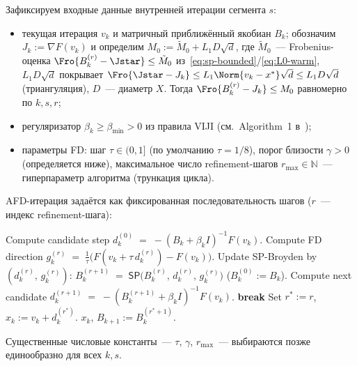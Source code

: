 Зафиксируем входные данные внутренней итерации сегмента $s$:
\begin{itemize}
\item текущая итерация $v_k$ и матричный приближённый якобиан $B_k$;
      обозначим $J_k := \nabla F(v_k)$ и определим
      $M_0 := \tilde M_{0} + L_1 D \sqrt{d}$, где $\tilde M_{0}$~---
      Frobenius-оценка $\Fro{B_k^{(r)} - \Jstar} \le \tilde M_{0}$
      из~\eqref{eq:sp-bounded}/\eqref{eq:L0-warm}, $L_1 D \sqrt{d}$
      покрывает $\Fro{\Jstar - J_k}\le L_1\Norm{v_k - x^*}\sqrt{d}\le L_1 D\sqrt{d}$
      (триангуляция), $D$~--- диаметр $X$. Тогда $\Fro{B_k^{(r)} - J_k}\le M_0$
      равномерно по $k, s, r$;
\item регуляризатор $\beta_k \ge \beta_{\min} > 0$ из правила VIJI
      (см.~Algorithm~1 в~\cite{Agafonov2024VIJI});
\item параметры FD: шаг $\tau \in (0, 1]$ (по умолчанию $\tau = 1/8$),
      порог близости $\gamma > 0$ (определяется ниже), максимальное
      число refinement-шагов $r_{\max} \in \mathbb{N}$~--- гиперпараметр
      алгоритма (трункация цикла).
\end{itemize}
AFD-итерация задаётся как фиксированная последовательность шагов
($r$~--- индекс refinement-шага):
\begin{algorithm}[t]
\caption{AFD: одна внутренняя итерация в $v_k$}
\label{alg:afd-inner}
\begin{algorithmic}[1]
\State Compute candidate step $d^{(0)}_k \;=\; -(B_k + \beta_k I)^{-1} F(v_k)$.
  \State Compute FD direction
         $g^{(r)}_k \;=\; \tfrac{1}{\tau}\bigl(F(v_k + \tau\, d^{(r)}_k) - F(v_k)\bigr)$.
  \State Update SP-Broyden by $(d^{(r)}_k,\, g^{(r)}_k)$:
         $B_k^{(r+1)} \;=\; \mathsf{SP}\bigl(B_k^{(r)},\, d^{(r)}_k,\, g^{(r)}_k\bigr)$
         \quad ($B_k^{(0)} := B_k$).
  \State Compute next candidate
         $d^{(r+1)}_k \;=\; -(B_k^{(r+1)} + \beta_k I)^{-1} F(v_k)$.
       \State \textbf{break} 
  \EndIf
\EndFor
\State Set $r^{*} := r$, $x_k := v_k + d^{(r^{*})}_k$.
\State \Return $x_k$, $B_{k+1} := B_k^{(r^{*}+1)}$.
\end{algorithmic}
\end{algorithm}

Существенные числовые константы~--- $\tau$, $\gamma$, $r_{\max}$~---
выбираются позже единообразно для всех $k, s$.

